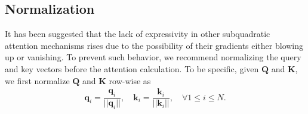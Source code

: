 \subsection{Normalization}
It has been suggested \cite{Qin2022-mp} that the lack of expressivity in other subquadratic attention mechanisms rises due to the possibility of their gradients either blowing up or vanishing. To prevent such behavior, we recommend normalizing the query and key vectors before the attention calculation. To be specific, given $\mathbf{Q}$ and $\mathbf{K}$, we first normalize $\mathbf{Q}$ and $\mathbf{K}$ row-wise as
\begin{gather}
    \mathbf{q}_i = \dfrac{\mathbf{q}_i}{||\mathbf{q}_i||}, \quad \mathbf{k}_i = \dfrac{\mathbf{k}_i}{||\mathbf{k}_i||}, \quad \forall 1 \leq i \leq N.
\end{gather}


